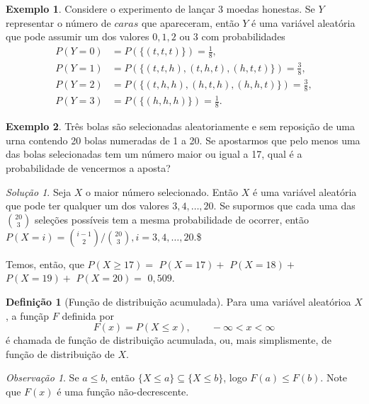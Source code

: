 \documentclass[]{book}
\theoremstyle{definition}
\newtheorem{definition}{Definição}[chapter]
\theoremstyle{definition}
\newtheorem{example}{Exemplo}[chapter]
\theoremstyle{definition}
\theoremstyle{remark}
\newtheorem*{remark}{Observação}
\newtheorem*{solution}{Solução}
\begin{document}
\begin{example}
\protect\hypertarget{exm:unnamed-chunk-133}{}{\label{exm:unnamed-chunk-133} }Considere o experimento de lançar 3 moedas honestas.
Se \(Y\) representar o número de \(caras\) que apareceram, então \(Y\) é uma variável aleatória que pode assumir um dos valores \(0,1,2\) ou \(3\) com probabilidades
\begin{align}
P(Y=0) &= P(\{(t,t,t)\}) = \frac{1}{8}, \\
P(Y=1) &= P(\{(t,t,h),(t,h,t),(h,t,t)\}) = \frac{3}{8}, \\
P(Y=2) &= P(\{(t,h,h),(h,t,h),(h,h,t)\}) = \frac{3}{8}, \\
P(Y=3) &= P(\{(h,h,h)\}) = \frac{1}{8}.
\end{align}
\end{example}

\begin{example}
\protect\hypertarget{exm:unnamed-chunk-134}{}{\label{exm:unnamed-chunk-134} }Três bolas são selecionadas aleatoriamente e sem reposição de uma urna contendo 20 bolas numeradas de 1 a 20.
Se apostarmos que pelo menos uma das bolas selecionadas tem um número maior ou igual a 17, qual é a probabilidade de vencermos a aposta?
\end{example}

\begin{solution}
\iffalse{} {Solução. } \fi{}Seja \(X\) o maior número selecionado.
Então \(X\) é uma variável aleatória que pode ter qualquer um dos valores \(3, 4, \ldots, 20\).
Se supormos que cada uma das \({20\choose 3}\) seleções possíveis tem a mesma probabilidade de ocorrer, então
\(P(X=i) = {{i-1} \choose 2}/{20\choose 3}, i = 3, 4, \ldots, 20.\)\$

Temos, então, que
\(P(X \geq 17)=\) \(P(X=17) +\) \(P(X=18) +\) \(P(X=19) +\) \(P(X=20) =\) \(0{,}509.\)
\end{solution}

\begin{definition}[Função de distribuição acumulada]
\protect\hypertarget{def:defFDA}{}{\label{def:defFDA} \iffalse (Função de distribuição acumulada) \fi{} }Para uma variável aleatórioa \(X\), a funçãp \(F\) definida por
\[F(x) = P(X\leq x), \qquad -\infty<x<\infty\]
é chamada de função de distribuição acumulada, ou, mais simplismente, de função de distribuição de \(X\).
\end{definition}

\begin{remark}
\iffalse{} {Observação. } \fi{}Se \(a \leq b\), então \(\{X\leq a\} \subseteq \{X \leq b\}\), logo \(F(a)\leq F(b)\).
Note que \(F(x)\) é uma função não-decrescente.
\end{remark}
\end{document}
